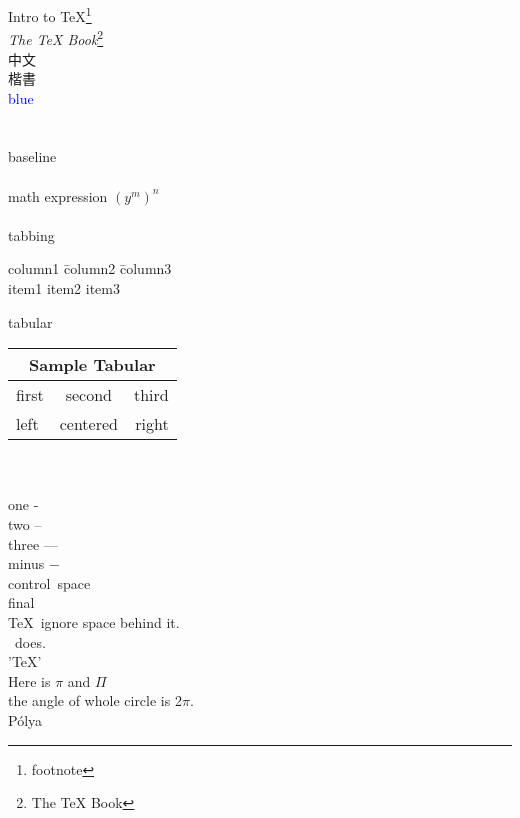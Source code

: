 Intro to \TeX\footnote{footnote}\\
\textit{The TeX Book}\footnote{The TeX Book}\\
\msjh 中文\rmfamily \\
\kai 楷書\rmfamily \\
\textcolor{blue}{blue}\\
\\ \\
baseline \raisebox{1ex}{upward}\raisebox{-1ex}{downward}\\\\
math expression $ (y^m)^n $ \\\\

tabbing
\begin{tabbing}
  column1 \= column2 \= column3 \\
  item1   \> item2   \> item3   \\
\end{tabbing}

tabular\\
\begin{tabular}{|l|c|r|}
  \hline
  \multicolumn{3}{|c|}{Sample Tabular}\\
  \hline
  first & second & third \\
  \cline{2-3}
  left  & centered & right \\
  \hline
\end{tabular}
\\\\
one -\\
two --\\
three ---\\
minus $ - $\\
control\ space\\
final\\
\TeX\ ignore space behind it.\\
\XeTeX\ does.\\
'\TeX'\\
Here is $\pi$ and $\Pi$\\
the angle of whole circle is 2$\pi$.\\
P\'olya\\




